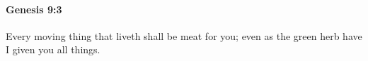 
		\paragraph{Genesis 9:3} %
			\label{GENESIS-9-3}

			Every moving thing that liveth shall be meat for you; even as the green herb have I given you all things.


